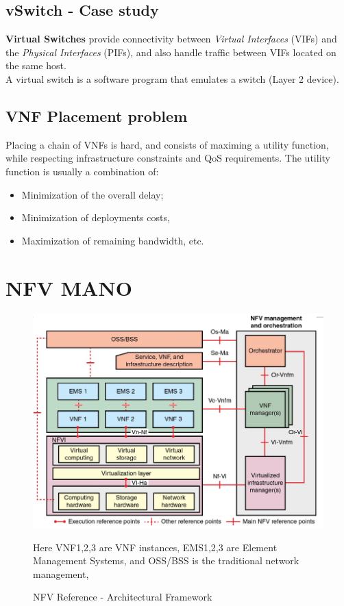 \subsection{vSwitch - Case study}
\textbf{Virtual Switches} provide connectivity between \textit{Virtual Interfaces} (VIFs) and the \textit{Physical Interfaces} (PIFs), and also handle traffic between VIFs located on the same host.\\
A virtual switch is a software program that emulates a switch (Layer 2 device).

\subsection{VNF Placement problem}
Placing a chain of VNFs is hard, and consists of maximing a utility function, while respecting infrastructure constraints and QoS requirements. The utility function is usually a combination of:
\begin{itemize}
   \item Minimization of the overall delay;
   \item Minimization of deployments costs,
   \item Maximization of remaining bandwidth, etc.
\end{itemize}

\section{NFV MANO}

\begin{figure}[htbp]
   \centering
   \includegraphics{images/NFV_mano.png}
   \caption{NFV Reference - Architectural Framework}
   Here VNF1,2,3 are VNF instances, EMS1,2,3 are Element Management Systems, and OSS/BSS is the traditional network management,
   \label{fig:NFV_mano}
\end{figure}

